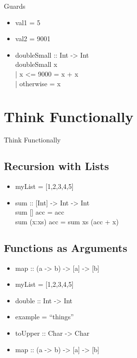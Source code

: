\documentclass{beamer}                  %
\newcommand{\srule}{
	\rule{\textwidth}{1pt}\\
}
\newlength{\subsecwidth}
\newenvironment{slide}{
	\begin{frame} %
	\settowidth{\subsecwidth}{\insertsubsection} %
	\ifthenelse{\dimtest{\subsecwidth}{<}{1pt}}{ %
		\frametitle{\insertsection\\             %
		\vspace{-1ex}                            %
		\color{fore}\srule                       %
		\par                                     %
		\vspace{-3ex}                            %
		}
	}{                                           %
		\frametitle{\insertsection\ -- \insertsubsection\\ %
		\vspace{-1ex}                            %
		\color{fore}\srule                       %
		\par                                     %
		\vspace{-3ex}                            %
		}
	}
	\Large                                       %
}{
	\end{frame}
}
\newcommand{\titleslide}[1]{
	\section{#1}             %
	\begin{slide}
		\begin{center}
			\color{comments}
			\Huge            %
			#1               %
		\end{center}
	\end{slide}
}
\begin{document}
\begin{slide}
  Guards
  \begin{itemize}
    \item val1 = 5
    \item val2 = 9001
    \item doubleSmall :: Int -> Int\\
      doubleSmall x\\
      | x <= 9000 = x + x\\
      | otherwise = x
  \end{itemize}
\end{slide}

\titleslide{Think Functionally}

\subsection{Recursion with Lists}

\begin{slide}
  \begin{itemize}
    \item myList = [1,2,3,4,5]
    \item sum :: [Int] -> Int -> Int\\
          sum [] acc     = acc\\
          sum (x:xs) acc = sum xs (acc + x)
  \end{itemize}
\end{slide}

\subsection{Functions as Arguments}

\begin{slide}
  \begin{itemize}
    \item map :: (a -> b) -> [a] -> [b]
    \item myList = [1,2,3,4,5]
    \item double :: Int -> Int
  \end{itemize}
\end{slide}

\begin{slide}
  \begin{itemize}
    \item example = ``things''
    \item toUpper :: Char -> Char
    \item map :: (a -> b) -> [a] -> [b]
  \end{itemize}
\end{slide}
\end{document}
